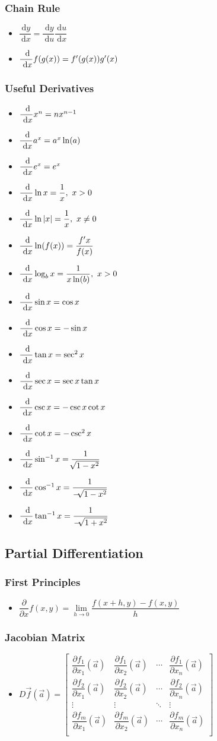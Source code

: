 \documentclass[]{report}
\newcommand \tab[1][1cm]{\hspace*{#1}}
\newcommand{\dn}[1]{\ \mathrm{d}#1}
\newcommand{\dd}[2]{ \dfrac{\dn #1}{\dn #2}}
\newcommand{\pp}[2]{\dfrac{\partial #1}{\partial #2}}
\newcommand{\itemt}{\item \tab}
\begin{document}
\subsubsection{Chain Rule}
\begin{itemize}
\itemt \( \dd{y}{x} = \dd{y}{u} \dd{u}{x}\)
\itemt \( \dd{}{x} f(g(x)) = f'(g(x)) g'(x) \)
\end{itemize}

\subsubsection{Useful Derivatives}

\begin{itemize}
\itemt \( \dd{}{x} x^n = nx^{n-1} \)
\itemt \( \dd{}{x} a^x = a^x \ln(a) \)
\itemt \( \dd{}{x} e^x = e^x \)
\itemt \( \dd{}{x} \ln x = \dfrac{1}{x},\ x>0 \)
\itemt \( \dd{}{x} \ln |x| = \dfrac{1}{x},\ x\neq 0 \)
\itemt \( \dd{}{x} \ln(f(x)) = \dfrac{f'x}{f(x)} \)
\itemt \( \dd{}{x} \log_bx = \dfrac{1}{x \ln(b)},\ x>0 \)
\itemt \( \dd{}{x} \sin x = \cos x \)
\itemt \( \dd{}{x} \cos x = -\sin x \)
\itemt \( \dd{}{x} \tan x = \sec^2x \)
\itemt \( \dd{}{x} \sec x = \sec x \tan x \)
\itemt \( \dd{}{x} \csc x = -\csc x \cot x \)
\itemt \( \dd{}{x} \cot x = -\csc^2 x \)
\itemt \( \dd{}{x} \sin^{-1} x = \dfrac{1}{\sqrt[]{1-x^2}} \)
\itemt \( \dd{}{x} \cos^{-1} x = \dfrac{1}{-\sqrt[]{1-x^2}} \)
\itemt \( \dd{}{x} \tan^{-1} x = \dfrac{1}{-\sqrt[]{1+x^2}} \)
\end{itemize}



		\subsection{Partial Differentiation}

\subsubsection{First Principles}
\begin{itemize}
\itemt \( \pp{}{x} f(x,y) = \lim\limits_{h\to0} \dfrac{f(x+h,y)-f(x,y)}{h} \)
\end{itemize}

\subsubsection{Jacobian Matrix}
\def\arraystretch{2.5}
\begin{itemize}
\itemt \( D\vec{f}(\vec{a}) = 
\begin{bmatrix}
\pp{f_1}{x_1}(\vec{a})	& \pp{f_1}{x_2}(\vec{a})	& \cdots 	& \pp{f_1}{x_n}(\vec{a}) \\
\pp{f_2}{x_1}(\vec{a})	& \pp{f_2}{x_2}(\vec{a})	& \cdots 	& \pp{f_2}{x_n}(\vec{a}) \\
\vdots						& \vdots					& \ddots	& \vdots \\
\pp{f_m}{x_1}(\vec{a})	& \pp{f_m}{x_2}(\vec{a})	 & \cdots 	& \pp{f_m}{x_n}(\vec{a}) \\
\end{bmatrix}
\)
\end{itemize}
\end{document}

